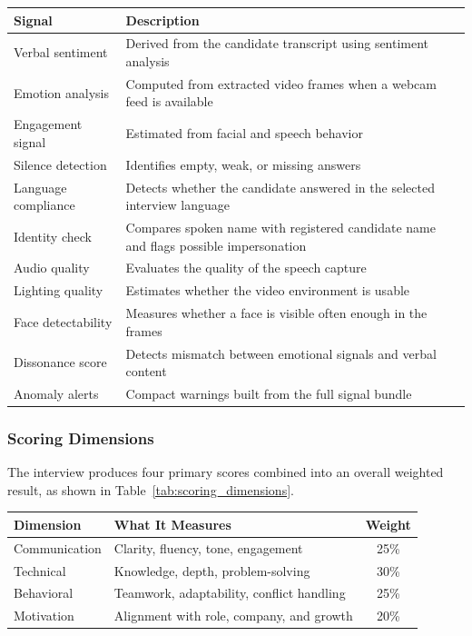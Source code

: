 \begin{center}
\label{tab:scoring_signals}
\renewcommand{\arraystretch}{0.8}

\begin{tabularx}{\textwidth}{|p{4cm}|X|}
\hline
\rowcolor{gray!20} \textbf{Signal} & \textbf{Description} \\
\hline
Verbal sentiment & Derived from the candidate transcript using sentiment analysis \\
\hline
Emotion analysis & Computed from extracted video frames when a webcam feed is available \\
\hline
Engagement signal & Estimated from facial and speech behavior \\
\hline
Silence detection & Identifies empty, weak, or missing answers \\
\hline
Language compliance & Detects whether the candidate answered in the selected interview language \\
\hline
Identity check & Compares spoken name with registered candidate name and flags possible impersonation \\
\hline
Audio quality & Evaluates the quality of the speech capture \\
\hline
Lighting quality & Estimates whether the video environment is usable \\
\hline
Face detectability & Measures whether a face is visible often enough in the frames \\
\hline
Dissonance score & Detects mismatch between emotional signals and verbal content \\
\hline
Anomaly alerts & Compact warnings built from the full signal bundle \\
\hline
\end{tabularx}
\end{center}

\subsubsection{Scoring Dimensions}

The interview produces four primary scores combined into an overall weighted result, as shown in Table~\ref{tab:scoring_dimensions}.

\begin{center}
\label{tab:scoring_dimensions}
\renewcommand{\arraystretch}{0.8}

\begin{tabularx}{\textwidth}{|l|l|c|}
\hline
\rowcolor{gray!20} \textbf{Dimension} & \textbf{What It Measures} & \textbf{Weight} \\
\hline
Communication & Clarity, fluency, tone, engagement & 25\% \\
\hline
Technical & Knowledge, depth, problem-solving & 30\% \\
\hline
Behavioral & Teamwork, adaptability, conflict handling & 25\% \\
\hline
Motivation & Alignment with role, company, and growth & 20\% \\
\hline
\end{tabularx}
\end{center}

